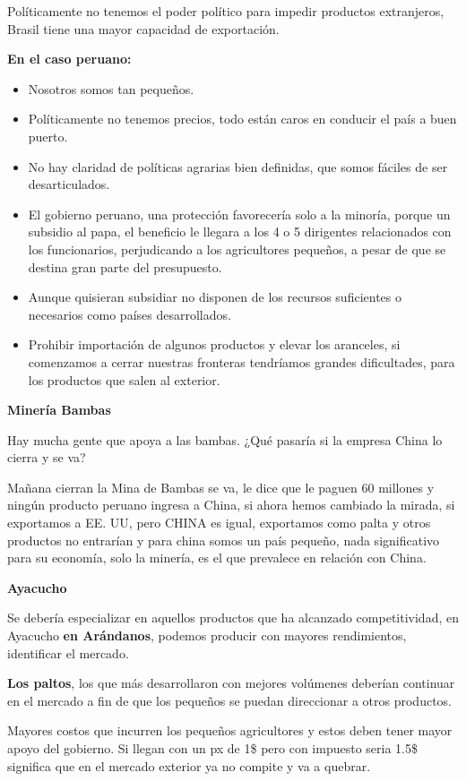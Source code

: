 \documentclass[
  a4paper,
]{article}
\begin{document}
Políticamente no tenemos el poder político para impedir productos
extranjeros, Brasil tiene una mayor capacidad de exportación.

\textbf{En el caso peruano:}

\begin{itemize}
\item
  Nosotros somos tan pequeños.
\item
  Políticamente no tenemos precios, todo están caros en conducir el país
  a buen puerto.
\item
  No hay claridad de políticas agrarias bien definidas, que somos
  fáciles de ser desarticulados.
\item
  El gobierno peruano, una protección favorecería solo a la minoría,
  porque un subsidio al papa, el beneficio le llegara a los 4 o 5
  dirigentes relacionados con los funcionarios, perjudicando a los
  agricultores pequeños, a pesar de que se destina gran parte del
  presupuesto.
\item
  Aunque quisieran subsidiar no disponen de los recursos suficientes o
  necesarios como países desarrollados.
\item
  Prohibir importación de algunos productos y elevar los aranceles, si
  comenzamos a cerrar nuestras fronteras tendríamos grandes
  dificultades, para los productos que salen al exterior.
\end{itemize}

\textbf{Minería Bambas}

Hay mucha gente que apoya a las bambas. ¿Qué pasaría si la empresa China
lo cierra y se va?

Mañana cierran la Mina de Bambas se va, le dice que le paguen 60
millones y ningún producto peruano ingresa a China, si ahora hemos
cambiado la mirada, si exportamos a EE. UU, pero CHINA es igual,
exportamos como palta y otros productos no entrarían y para china somos
un país pequeño, nada significativo para su economía, solo la minería,
es el que prevalece en relación con China.

\textbf{Ayacucho}

Se debería especializar en aquellos productos que ha alcanzado
competitividad, en Ayacucho \textbf{en Arándanos}, podemos producir con
mayores rendimientos, identificar el mercado.

\textbf{Los paltos}, los que más desarrollaron con mejores volúmenes
deberían continuar en el mercado a fin de que los pequeños se puedan
direccionar a otros productos.

Mayores costos que incurren los pequeños agricultores y estos deben
tener mayor apoyo del gobierno. Si llegan con un px de 1\$ pero con
impuesto seria 1.5\$ significa que en el mercado exterior ya no compite
y va a quebrar.
\end{document}

